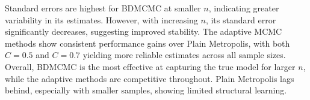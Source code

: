 \documentclass{report}
\begin{document}
Standard errors are highest for BDMCMC at smaller $n$, indicating greater variability in its estimates. However, with increasing $n$, its standard error significantly decreases, suggesting improved stability. The adaptive MCMC methods show consistent performance gains over Plain Metropolis, with both $C = 0.5$ and $C = 0.7$ yielding more reliable estimates across all sample sizes.
Overall, BDMCMC is the most effective at capturing the true model for larger $n$, while the adaptive methods are competitive throughout. Plain Metropolis lags behind, especially with smaller samples, showing limited structural learning.

\begin{figure}[!ht]
	\centering
\end{figure}
\end{document}

